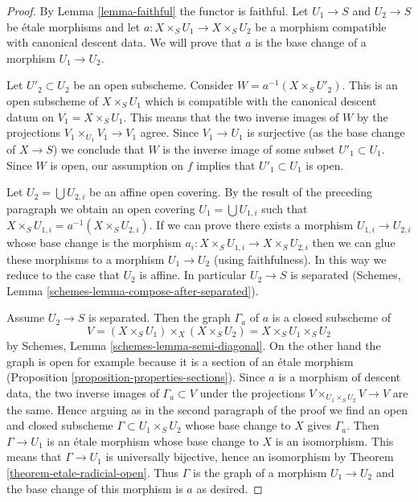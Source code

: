 \documentclass[10pt,a4paper]{amsart}
\theoremstyle{plain}
\theoremstyle{definition}
\theoremstyle{remark}
\numberwithin{equation}{subsection}
\begin{document}
\begin{proof}
By Lemma \ref{lemma-faithful} the functor is faithful.
Let $U_1 \to S$ and $U_2 \to S$ be \'etale morphisms
and let $a : X \times_S U_1 \to X \times_S U_2$ be a
morphism compatible with canonical descent data.
We will prove that $a$ is the base change of a morphism $U_1 \to U_2$.

\medskip\noindent
Let $U'_2 \subset U_2$ be an open subscheme. Consider
$W = a^{-1}(X \times_S U'_2)$. This is an open subscheme
of $X \times_S U_1$ which is compatible with the canonical
descent datum on $V_1 = X \times_S U_1$. This means that the
two inverse images of $W$ by the projections
$V_1 \times_{U_1} V_1 \to V_1$ agree. Since $V_1 \to U_1$
is surjective (as the base change of $X \to S$) we conclude
that $W$ is the inverse image of some subset $U'_1 \subset U_1$.
Since $W$ is open, our assumption on $f$ implies that $U'_1 \subset U_1$
is open.

\medskip\noindent
Let $U_2 = \bigcup U_{2, i}$ be an affine open covering.
By the result of the preceding paragraph we obtain an open
covering $U_1 = \bigcup U_{1, i}$ such that
$X \times_S U_{1, i} = a^{-1}(X \times_S U_{2, i})$.
If we can prove there exists a morphism $U_{1, i} \to U_{2, i}$
whose base change is the morphism
$a_i : X \times_S U_{1, i} \to X \times_S U_{2, i}$
then we can glue these morphisms to a morphism $U_1 \to U_2$
(using faithfulness). In this way we reduce to the case that
$U_2$ is affine. In particular $U_2 \to S$ is separated
(Schemes, Lemma \ref{schemes-lemma-compose-after-separated}).

\medskip\noindent
Assume $U_2 \to S$ is separated. Then the graph $\Gamma_a$ of $a$
is a closed subscheme of
$$
V = (X \times_S U_1) \times_X (X \times_S U_2) = X \times_S U_1 \times_S U_2
$$
by Schemes, Lemma \ref{schemes-lemma-semi-diagonal}.
On the other hand the graph is open for example
because it is a section of an \'etale morphism
(Proposition \ref{proposition-properties-sections}).
Since $a$ is a morphism of descent data, the two inverse images of
$\Gamma_a \subset V$ under the projections
$V \times_{U_1 \times_S U_2} V \to V$ are the same.
Hence arguing as in the second paragraph of the proof we
find an open and closed subscheme $\Gamma \subset U_1 \times_S U_2$
whose base change to $X$ gives $\Gamma_a$. Then
$\Gamma \to U_1$ is an \'etale morphism whose base change
to $X$ is an isomorphism. This means that $\Gamma \to U_1$
is universally bijective, hence an isomorphism
by Theorem \ref{theorem-etale-radicial-open}.
Thus $\Gamma$ is the graph of a morphism $U_1 \to U_2$
and the base change of this morphism is $a$ as desired.
\end{proof}
\end{document}
